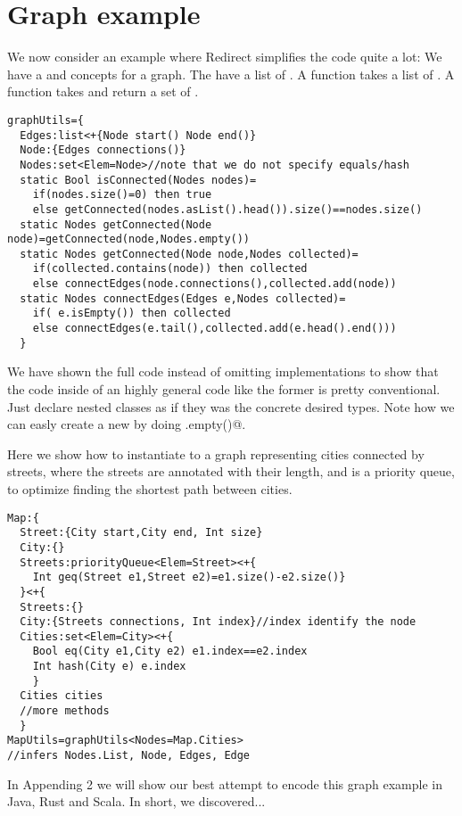 \section{Graph example}
We now consider an example where Redirect simplifies the code quite a lot:
We have a \Q@Node@ and \Q@Edge@ concepts for a graph.
The \Q@Node@ have a list of \Q@Edge@s.
A \Q@isConnected@ function takes a list of \Q@Node@s.
A \Q@getConnected@ function takes \Q@Node@ and return a set of \Q@Node@s.
\begin{lstlisting}
graphUtils={
  Edges:list<+{Node start() Node end()}
  Node:{Edges connections()}
  Nodes:set<Elem=Node>//note that we do not specify equals/hash
  static Bool isConnected(Nodes nodes)=
    if(nodes.size()=0) then true
    else getConnected(nodes.asList().head()).size()==nodes.size()
  static Nodes getConnected(Node node)=getConnected(node,Nodes.empty())
  static Nodes getConnected(Node node,Nodes collected)=
    if(collected.contains(node)) then collected
    else connectEdges(node.connections(),collected.add(node))
  static Nodes connectEdges(Edges e,Nodes collected)=
    if( e.isEmpty()) then collected
    else connectEdges(e.tail(),collected.add(e.head().end()))
  }
\end{lstlisting}

We have shown the full code instead of omitting implementations to show that
the code inside of an highly general code like the former is pretty conventional.
Just declare nested classes as if they was the concrete desired types. Note how we can easly create a new \@Nodes@ by doing \Q@Nodes.empty()@.

Here we show how to instantiate \Q@graphUtils@ to a graph representing cities connected by streets,
where the streets are annotated with their length, and \Q@Edges@ is a priority queue, to optimize
finding the shortest path between cities.

\begin{lstlisting}
Map:{
  Street:{City start,City end, Int size}
  City:{}
  Streets:priorityQueue<Elem=Street><+{    
    Int geq(Street e1,Street e2)=e1.size()-e2.size()}
  }<+{
  Streets:{}
  City:{Streets connections, Int index}//index identify the node
  Cities:set<Elem=City><+{
    Bool eq(City e1,City e2) e1.index==e2.index
    Int hash(City e) e.index
    }
  Cities cities
  //more methods
  }
MapUtils=graphUtils<Nodes=Map.Cities>
//infers Nodes.List, Node, Edges, Edge
\end{lstlisting}

In Appending 2 we will show our best attempt to encode this graph example in Java, Rust and Scala.
In short, we discovered...




